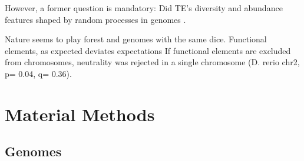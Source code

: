 However, a former question is mandatory: Did TE's diversity and abundance features shaped by random processes in genomes \cite{Lynch2003,Venner2009}. 

Nature seems to play forest and genomes with the same dice.
Functional elements, as expected deviates expectations If functional elements are excluded from chromosomes, neutrality was rejected in a single chromosome (D. rerio chr2, p= 0.04, q= 0.36).


\section{Material Methods}

\subsection{Genomes}

